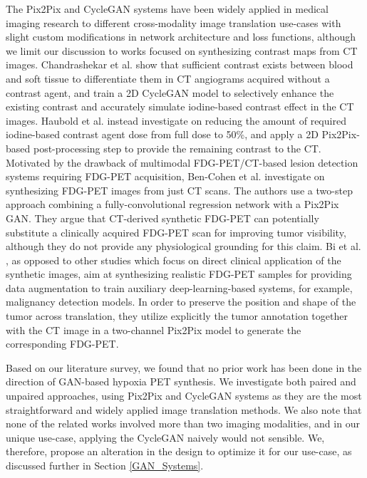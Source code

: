 The Pix2Pix and CycleGAN systems have been widely applied in medical imaging research to different cross-modality image translation use-cases \cite{yi2019generative} with slight custom modifications in network architecture and loss functions, although we limit our discussion to works focused on synthesizing contrast maps from CT images. Chandrashekar et al. \cite{chandrashekar2020deep} show that sufficient contrast exists between blood and soft tissue to differentiate them in CT angiograms acquired without a contrast agent, and train a 2D CycleGAN model to selectively enhance the existing contrast and accurately simulate iodine-based contrast effect in the CT images. Haubold et al. \cite{haubold2021contrast} instead investigate on reducing the amount of required iodine-based contrast agent dose from full dose to 50\%, and apply a 2D Pix2Pix-based post-processing step to provide the remaining contrast to the CT. Motivated by the drawback of multimodal FDG-PET/CT-based lesion detection systems requiring FDG-PET acquisition, Ben-Cohen et al. \cite{bencohen2018crossmodality} investigate on synthesizing FDG-PET images from just CT scans. The authors use a two-step approach combining a fully-convolutional regression network with a Pix2Pix GAN. They argue that CT-derived synthetic FDG-PET can potentially substitute a clinically acquired FDG-PET scan for improving tumor visibility, although they do not provide any physiological grounding for this claim. Bi et al. \cite{bi2017synthesis}, as opposed to other studies which focus on direct clinical application of the synthetic images, aim at synthesizing realistic FDG-PET samples for providing data augmentation to train auxiliary deep-learning-based systems, for example, malignancy detection models. In order to preserve the position and shape of the tumor across translation, they utilize explicitly the tumor annotation together with the CT image in a two-channel Pix2Pix model to generate the corresponding FDG-PET. 

Based on our literature survey, we found that no prior work has been done in the direction of GAN-based hypoxia PET synthesis. We investigate both paired and unpaired approaches, using Pix2Pix and CycleGAN systems as they are the most straightforward and widely applied image translation methods. We also note that none of the related works involved more than two imaging modalities, and in our unique use-case, applying the CycleGAN naively would not sensible. We, therefore, propose an alteration in the design to optimize it for our use-case, as discussed further in Section \ref{GAN_Systems}.



